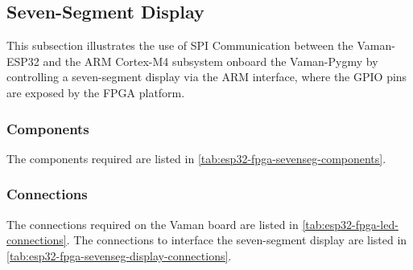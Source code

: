 \subsection{Seven-Segment Display}
This subsection illustrates the use of SPI Communication between the Vaman-ESP32
and the ARM Cortex-M4 subsystem onboard the Vaman-Pygmy by controlling a
seven-segment display via the ARM interface, where the GPIO pins are exposed by
the FPGA platform.

\subsubsection{Components}
The components required are listed in
\autoref{tab:esp32-fpga-sevenseg-components}.

\subsubsection{Connections}
The connections required on the Vaman board are listed in
\autoref{tab:esp32-fpga-led-connections}. The connections to interface the
seven-segment display are listed in
\autoref{tab:esp32-fpga-sevenseg-display-connections}.

